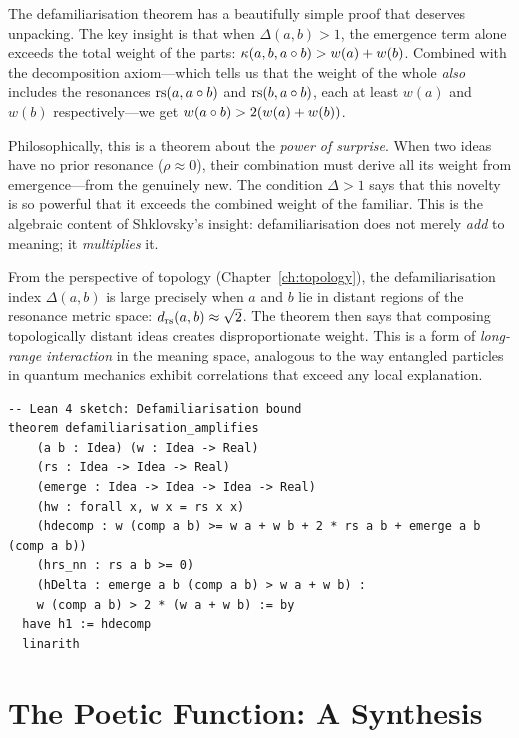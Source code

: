 \begin{remark}
The defamiliarisation theorem has a beautifully simple proof that
deserves unpacking.  The key insight is that when $\Delta(a,b) > 1$,
the emergence term alone exceeds the total weight of the parts:
$\kappa(a,b,a \circ b) > w(a) + w(b)$.  Combined with the
decomposition axiom---which tells us that the weight of the whole
\emph{also} includes the resonances $\mathrm{rs}(a, a\circ b)$ and
$\mathrm{rs}(b, a\circ b)$, each at least $w(a)$ and $w(b)$ respectively---we
get $w(a \circ b) > 2(w(a) + w(b))$.

Philosophically, this is a theorem about the \emph{power of surprise}.
When two ideas have no prior resonance ($\rho \approx 0$), their
combination must derive all its weight from emergence---from the
genuinely new.  The condition $\Delta > 1$ says that this novelty
is so powerful that it exceeds the combined weight of the familiar.
This is the algebraic content of Shklovsky's insight: defamiliarisation
does not merely \emph{add} to meaning; it \emph{multiplies} it.

From the perspective of topology (Chapter~\ref{ch:topology}), the
defamiliarisation index $\Delta(a,b)$ is large precisely when $a$
and $b$ lie in distant regions of the resonance metric space:
$d_{\mathrm{rs}}(a,b) \approx \sqrt{2}$.  The theorem then says that
composing topologically distant ideas creates disproportionate weight.
This is a form of \emph{long-range interaction} in the meaning space,
analogous to the way entangled particles in quantum mechanics exhibit
correlations that exceed any local explanation.
\end{remark}

\begin{lstlisting}
-- Lean 4 sketch: Defamiliarisation bound
theorem defamiliarisation_amplifies
    (a b : Idea) (w : Idea -> Real)
    (rs : Idea -> Idea -> Real)
    (emerge : Idea -> Idea -> Idea -> Real)
    (hw : forall x, w x = rs x x)
    (hdecomp : w (comp a b) >= w a + w b + 2 * rs a b + emerge a b (comp a b))
    (hrs_nn : rs a b >= 0)
    (hDelta : emerge a b (comp a b) > w a + w b) :
    w (comp a b) > 2 * (w a + w b) := by
  have h1 := hdecomp
  linarith
\end{lstlisting}

\section{The Poetic Function: A Synthesis}
\label{sec:poetic-function}

